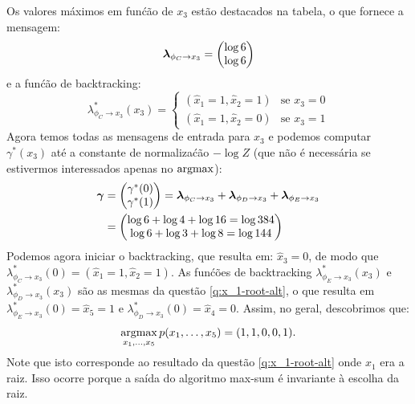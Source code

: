 \begin{exenumerate}
\begin{solution}
\begin{center}
\begin{tabular}{llll}
            \end{tabular}
        \end{center}
        Os valores m\'aximos em fun\'c\~ao de $x_3$ est\~ao destacados na tabela, o que fornece a mensagem:
        \begin{equation}
            \boldsymbol{\lambda}_{\phi_C \to x_3} = \begin{pmatrix}
                \log 6\\
                \log 6
            \end{pmatrix}
        \end{equation}
        e a fun\'c\~ao de backtracking:
        \begin{equation}
            \lambda^*_{\phi_C \to x_3}(x_3) = \begin{cases}
                (\hat{x}_1=1, \hat{x}_2=1) & \text{se } x_3=0\\
                (\hat{x}_1=1, \hat{x}_2=0) & \text{se } x_3=1
            \end{cases}
        \end{equation}
        Agora temos todas as mensagens de entrada para $x_3$ e podemos computar
        $\gamma^*(x_3)$ at\'e a constante de normaliza\'c\~ao $-\log Z$ (que n\~ao \'e
        necess\'aria se estivermos interessados apenas no $\operatorname*{\mathrm{argmax}}$):
        \begin{align}
            \boldsymbol{\gamma}&=\begin{pmatrix}
                \gamma^*(0) \\
                \gamma^*(1)
            \end{pmatrix}
            =  \boldsymbol{\lambda}_{\phi_C \to x_3} +  \boldsymbol{\lambda}_{\phi_D \to x_3} +  \boldsymbol{\lambda}_{\phi_E \to x_3}\\
            & = \begin{pmatrix}
                \log 6 + \log 4 + \log 16 = \log 384 \\
                \log 6 + \log 3 + \log 8 = \log 144
            \end{pmatrix}
        \end{align}
        Podemos agora iniciar o backtracking, que resulta em: $\hat{x}_3 = 0$,
        de modo que $\lambda^*_{\phi_C \to x_3}(0) = (\hat{x}_1=1, \hat{x}_2=1)$. As fun\'c\~oes de backtracking $\lambda^*_{\phi_E \to x_3}(x_3)$ e $\lambda^*_{\phi_D \to x_3}(x_3)$ s\~ao as mesmas da quest\~ao \ref{q:x_1-root-alt}, o que resulta em $\lambda^*_{\phi_E \to x_3}(0) = \hat{x}_5=1$ e $\lambda^*_{\phi_D \to x_3}(0) = \hat{x}_4=0$. Assim, no geral, descobrimos que:
        \begin{equation}
            \operatorname*{\mathrm{argmax}}_{x_1, \ldots, x_5} p(x_1, \ldots, x_5) = (1, 1, 0, 0, 1).
        \end{equation}
        Note que isto corresponde ao resultado da quest\~ao \ref{q:x_1-root-alt} onde $x_1$ era a raiz. Isso ocorre porque a sa\'ida do algoritmo max-sum \'e invariante \`a escolha da raiz.
        
    \end{solution}
    
\end{exenumerate}

